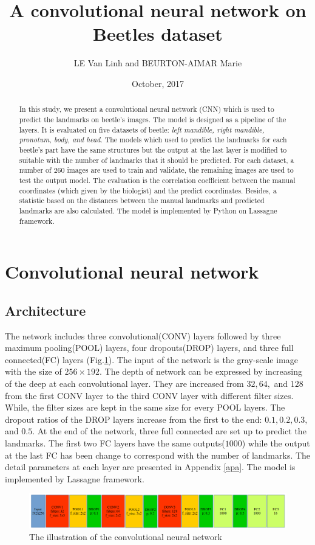 \documentclass[12pt,a4paper]{article}
\begin{document}
\title{A convolutional neural network on Beetles dataset }
\author{LE Van Linh and BEURTON-AIMAR Marie}
\date{October, 2017}
\maketitle
\begin{abstract}
In this study, we present a convolutional neural network (CNN) which is used to predict the landmarks on beetle's images.  The model is designed as a pipeline of the layers. It is evaluated on five datasets of beetle: \textit{left mandible, right mandible, pronotum, body, and head}. The models which used to predict the landmarks for each beetle's part have the same structures but the output at the last layer is modified to suitable with the number of landmarks that it should be predicted. For each dataset, a number of $260$ images are used to train and validate, the remaining images are used to test the output model. The evaluation is the correlation coefficient between the manual coordinates (which given by the biologist) and the predict coordinates. Besides, a statistic based on the distances between the manual landmarks and predicted landmarks are also calculated. The model is implemented by Python on Lassagne framework\cite{lasagne}.
\end{abstract}

\section{Convolutional neural network}
\subsection{Architecture}
The network includes three convolutional(CONV) layers followed by three maximum pooling(POOL) layers, four dropouts(DROP) layers, and three full connected(FC) layers (Fig.\ref{pmodel}). The input of the network is the gray-scale image with the size of $256 \times 192$. The depth of network can be expressed by increasing of the deep at each convolutional layer. They are increased from $32, 64,$ and $128$ from the first CONV layer to the third CONV layer with different filter sizes. While, the filter sizes are kept in the same size for every POOL layers. The dropout ratios of the DROP layers increase from the first to the end: $0.1, 0.2, 0.3, $ and $0.5$. At the end of the network, three full connected are set up to predict the landmarks. The first two FC layers have the same outputs($1000$) while the output at the last FC has been change to correspond with the number of landmarks. The detail parameters at each layer are presented in Appendix \ref{apa}. The model is implemented by Lassagne framework\cite{lasagne}.
\begin{figure}[h!]
	\centering
	\includegraphics[scale=0.45]{images/model3_dropout}
	\caption{The illustration of the convolutional neural network}
	\label{pmodel}
\end{figure}
\end{document}

